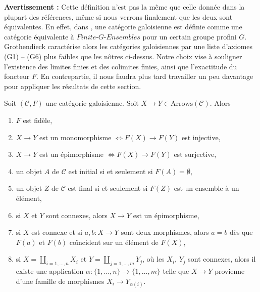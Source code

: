 \noindent
{\bf Avertissement :} Cette définition n'est pas la même que celle donnée dans la plupart
des références, même si nous verrons finalement que les deux sont équivalentes.
En effet, dans \cite[Expos\'e V, Définition 5.1]{SGA1}, une catégorie galoisienne est
définie comme une catégorie équivalente à $\textit{Finite-}G\textit{-Ensembles}$
pour un certain groupe profini $G$. Grothendieck caractérise alors les
catégories galoisiennes par une liste d'axiomes (G1) -- (G6) plus faibles
que les nôtres ci-dessus. Notre choix vise à souligner
l'existence des limites finies et des colimites finies, ainsi que l'exactitude du
foncteur $F$. En contrepartie, il nous faudra plus tard travailler
un peu davantage pour appliquer les résultats de cette section.

\begin{lemma}
\label{lemma-epi-mono}
Soit $(\mathcal{C}, F)$ une catégorie galoisienne. Soit
$X \to Y \in \text{Arrows}(\mathcal{C})$. Alors
\begin{enumerate}
\item $F$ est fidèle,
\item $X \to Y$ est un monomorphisme
$\Leftrightarrow F(X) \to F(Y)$ est injective,
\item $X \to Y$ est un épimorphisme
$\Leftrightarrow F(X) \to F(Y)$ est surjective,
\item un objet $A$ de $\mathcal{C}$ est initial si et seulement si
$F(A) = \emptyset$,
\item un objet $Z$ de $\mathcal{C}$ est final si et seulement si
$F(Z)$ est un ensemble à un élément,
\item si $X$ et $Y$ sont connexes, alors $X \to Y$ est un épimorphisme,
\item
\label{item-one-element}
si $X$ est connexe et si $a, b : X \to Y$ sont deux morphismes,
alors $a = b$ dès que $F(a)$ et $F(b)$ coïncident sur un élément de $F(X)$,
\item si $X = \coprod_{i = 1, \ldots, n} X_i$ et
$Y = \coprod_{j = 1, \ldots, m} Y_j$, où les $X_i$, $Y_j$ sont connexes,
alors il existe une application $\alpha : \{1, \ldots, n\} \to \{1, \ldots, m\}$
telle que $X \to Y$ provienne d'une famille de morphismes
$X_i \to Y_{\alpha(i)}$.
\end{enumerate}
\end{lemma}

